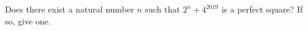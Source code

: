 Does there exist a natural number $n$ such that $2^n+4^{2019}$ is a perfect square? If so, give one.
